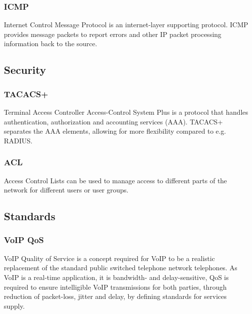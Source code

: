 \subsubsection{ICMP}
\vspace{-0.8em}
Internet Control Message Protocol is an internet-layer supporting protocol.
ICMP provides message packets to report errors and other IP packet processing information back to the source. \cite{ICMP}

\subsection{Security}

\subsubsection{TACACS+}
Terminal Access Controller Access-Control System Plus is a protocol that handles authentication, authorization and accounting services (AAA).
TACACS+ separates the AAA elements, allowing for more flexibility compared to e.g. RADIUS.
\cite{TACACS+}

\subsubsection{ACL}
Access Control Lists can be used to manage access to different parts of the network for different users or user groups.

\subsection{Standards}

\subsubsection{VoIP QoS}
VoIP Quality of Service is a concept required for VoIP to be a realistic replacement of the standard public switched telephone network telephones.
As VoIP is a real-time application, it is bandwidth- and delay-sensitive, QoS is required to ensure intelligible VoIP transmissions for both parties, through reduction of packet-loss, jitter and delay, by defining standards for services supply. \cite{VoIP-QoS}
